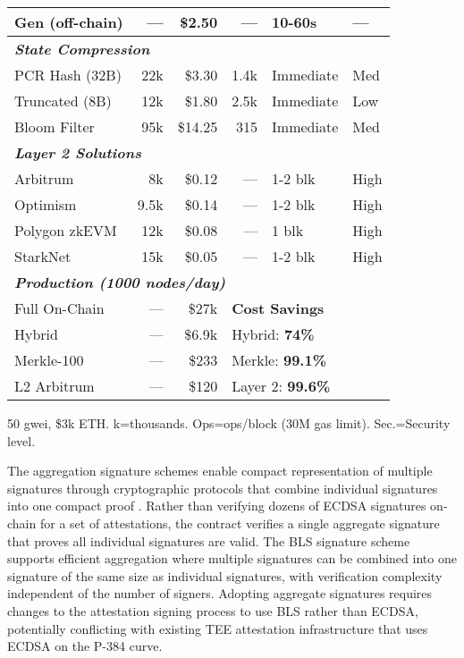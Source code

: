 \begin{table}[htbp]
\begin{tabular}{@{}lrrrll@{}}
\quad Gen (off-chain) & --- & \$2.50 & --- & 10-60s & --- \\
\midrule
\multicolumn{6}{l}{\textit{\textbf{State Compression}}} \\
PCR Hash (32B) & 22k & \$3.30 & 1.4k & Immediate & Med \\
Truncated (8B) & 12k & \$1.80 & 2.5k & Immediate & Low \\
Bloom Filter & 95k & \$14.25 & 315 & Immediate & Med \\
\midrule
\multicolumn{6}{l}{\textit{\textbf{Layer 2 Solutions}}} \\
Arbitrum & 8k & \$0.12 & --- & 1-2 blk & High \\
Optimism & 9.5k & \$0.14 & --- & 1-2 blk & High \\
Polygon zkEVM & 12k & \$0.08 & --- & 1 blk & High \\
StarkNet & 15k & \$0.05 & --- & 1-2 blk & High \\
\midrule
\multicolumn{6}{l}{\textit{\textbf{Production (1000 nodes/day)}}} \\
Full On-Chain & --- & \$27k & \multicolumn{3}{l}{\textbf{Cost Savings}} \\
Hybrid & --- & \$6.9k & \multicolumn{3}{l}{Hybrid: \textbf{74\%}} \\
Merkle-100 & --- & \$233 & \multicolumn{3}{l}{Merkle: \textbf{99.1\%}} \\
L2 Arbitrum & --- & \$120 & \multicolumn{3}{l}{Layer 2: \textbf{99.6\%}} \\
\bottomrule
\end{tabular}
\begin{tablenotes}
\scriptsize
\item * 50 gwei, \$3k ETH. k=thousands. Ops=ops/block (30M gas limit). Sec.=Security level.
\end{tablenotes}
\end{table}

The aggregation signature schemes enable compact representation of multiple signatures through cryptographic protocols that combine individual signatures into one compact proof \cite{threshold_crypto}. Rather than verifying dozens of ECDSA signatures on-chain for a set of attestations, the contract verifies a single aggregate signature that proves all individual signatures are valid. The BLS signature scheme supports efficient aggregation where multiple signatures can be combined into one signature of the same size as individual signatures, with verification complexity independent of the number of signers. Adopting aggregate signatures requires changes to the attestation signing process to use BLS rather than ECDSA, potentially conflicting with existing TEE attestation infrastructure that uses ECDSA on the P-384 curve.

